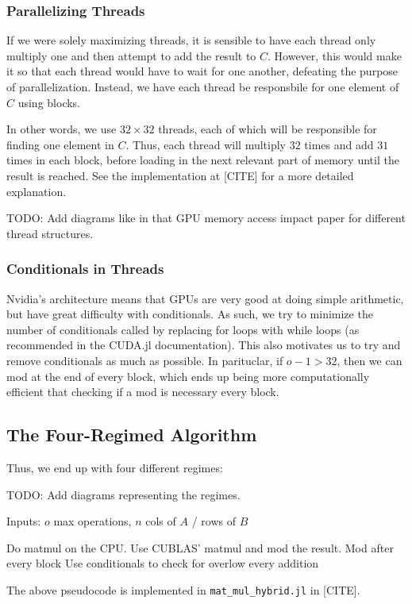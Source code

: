 \subsubsection{Parallelizing Threads}

If we were solely maximizing threads, it is sensible to have each thread only multiply one and then attempt to add the result to $C$. However, this would make it so that each thread would have to wait for one another, defeating the purpose of parallelization. Instead, we have each thread be responsbile for one element of $C$ using blocks. 

In other words, we use $32 \times 32$ threads, each of which will be responsible for finding one element in $C$. Thus, each thread will multiply $32$ times and add $31$ times in each block, before loading in the next relevant part of memory until the result is reached. See the implementation at [CITE] for a more detailed explanation.

TODO: Add diagrams like in that GPU memory access impact paper for different thread structures.

\subsubsection{Conditionals in Threads}

Nvidia's architecture means that GPUs are very good at doing simple arithmetic, but have great difficulty with conditionals. As such, we try to minimize the number of conditionals called by replacing for loops with while loops (as recommended in the CUDA.jl documentation). This also motivates us to try and remove conditionals as much as possible. In parituclar, if $o - 1 > 32$, then we can mod at the end of every block, which ends up being more computationally efficient that checking if a mod is necessary every block.

\subsection{The Four-Regimed Algorithm}

Thus, we end up with four different regimes:

TODO: Add diagrams representing the regimes.

\begin{alg}
    Inputs: $o$ max operations, $n$ cols of $A$ / rows of $B$
    \begin{algorithmic}
            \State Do matmul on the CPU.
            \State Use CUBLAS' matmul and mod the result.
            \State Mod after every block
        \Else
            \State Use conditionals to check for overlow every addition
        \EndIf
    \end{algorithmic}
\end{alg}
The above pseudocode is implemented in \texttt{mat\_mul\_hybrid.jl} in [CITE].

